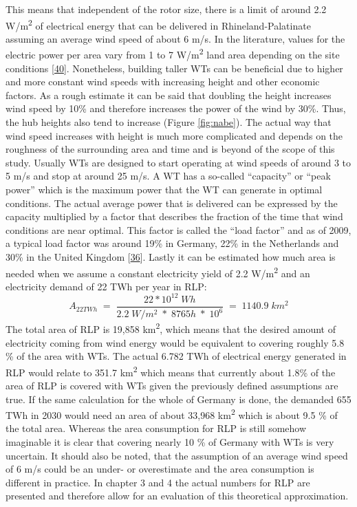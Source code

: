 \documentclass[a4paper,11pt]{article}
\begin{document}
This means that independent of the rotor size, there is a limit of around 2.2 W/m\textsuperscript{2} of electrical energy that can be delivered in Rhineland-Palatinate assuming an average wind speed of about 6 m/s. In the literature, values for the electric power per area vary from 1 to 7 W/m\textsuperscript{2} land area depending on the site conditions {[}\protect\hyperlink{ref-SvenLinow.2020}{40}{]}. Nonetheless, building taller WTs can be beneficial due to higher and more constant wind speeds with increasing height and other economic factors. As a rough estimate it can be said that doubling the height increases wind speed by 10\% and therefore increases the power of the wind by 30\%. Thus, the hub heights also tend to increase (Figure \ref{fig:nabe}). The actual way that wind speed increases with height is much more complicated and depends on the roughness of the surrounding area and time and is beyond of the scope of this study. Usually WTs are designed to start operating at wind speeds of around 3 to 5 m/s and stop at around 25 m/s. A WT has a so-called ``capacity'' or ``peak power'' which is the maximum power that the WT can generate in optimal conditions. The actual average power that is delivered can be expressed by the capacity multiplied by a factor that describes the fraction of the time that wind conditions are near optimal. This factor is called the ``load factor'' and as of 2009, a typical load factor was around 19\% in Germany, 22\% in the Netherlands and 30\% in the United Kingdom {[}\protect\hyperlink{ref-DavidJCMacKay.2009}{36}{]}. Lastly it can be estimated how much area is needed when we assume a constant electricity yield of 2.2 W/m\textsuperscript{2} and an electricity demand of 22 TWh per year in RLP:
\begin{equation}
A_{22TWh}\;=\;\frac{22 * 10^{12}\; Wh}{2.2\;W/m^2\; *\; 8765h\; *\; 10^6}\;=\;1140.9\;km^2
\end{equation}
The total area of RLP is 19,858 km\textsuperscript{2}, which means that the desired amount of electricity coming from wind energy would be equivalent to covering roughly 5.8 \% of the area with WTs. The actual 6.782 TWh of electrical energy generated in RLP would relate to 351.7 km\textsuperscript{2} which means that currently about 1.8\% of the area of RLP is covered with WTs given the previously defined assumptions are true. If the same calculation for the whole of Germany is done, the demanded 655 TWh in 2030 would need an area of about 33,968 km\textsuperscript{2} which is about 9.5 \% of the total area. Whereas the area consumption for RLP is still somehow imaginable it is clear that covering nearly 10 \% of Germany with WTs is very uncertain. It should also be noted, that the assumption of an average wind speed of 6 m/s could be an under- or overestimate and the area consumption is different in practice. In chapter 3 and 4 the actual numbers for RLP are presented and therefore allow for an evaluation of this theoretical approximation.
\end{document}
